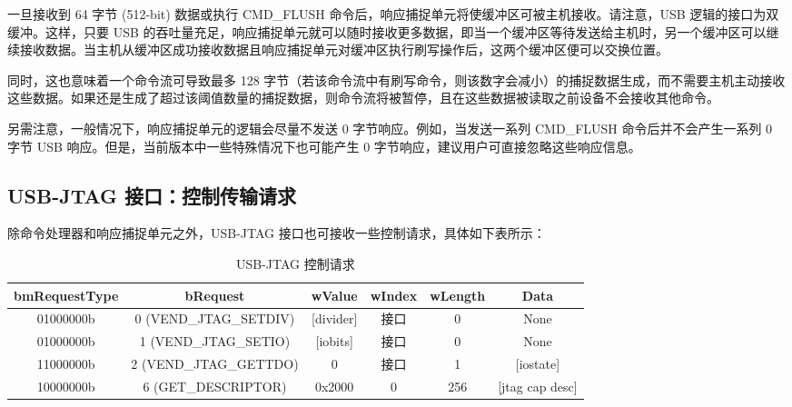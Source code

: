 \documentclass[main\_\_CN.tex]{subfiles}
\begin{document}
一旦接收到 64 字节 (512-bit) 数据或执行 CMD\_FLUSH 命令后，响应捕捉单元将使缓冲区可被主机接收。请注意，USB 逻辑的接口为双缓冲。这样，只要 USB 的吞吐量充足，响应捕捉单元就可以随时接收更多数据，即当一个缓冲区等待发送给主机时，另一个缓冲区可以继续接收数据。当主机从缓冲区成功接收数据且响应捕捉单元对缓冲区执行刷写操作后，这两个缓冲区便可以交换位置。

同时，这也意味着一个命令流可导致最多 128 字节（若该命令流中有刷写命令，则该数字会减小）的捕捉数据生成，而不需要主机主动接收这些数据。如果还是生成了超过该阈值数量的捕捉数据，则命令流将被暂停，且在这些数据被读取之前设备不会接收其他命令。

另需注意，一般情况下，响应捕捉单元的逻辑会尽量不发送 0 字节响应。例如，当发送一系列 CMD\_FLUSH 命令后并不会产生一系列 0 字节 USB 响应。但是，当前版本中一些特殊情况下也可能产生 0 字节响应，建议用户可直接忽略这些响应信息。

\subsection{USB-JTAG 接口：控制传输请求}

除命令处理器和响应捕捉单元之外，USB-JTAG 接口也可接收一些控制请求，具体如下表所示：

\begin{table}[H]
    \centering
    \caption{USB-JTAG 控制请求}
    \label{tab:usbserialjtag-control-requests}
    \begin{tabular}{|c|c|c|c|c|c|}
    \hline
       \rowcolor{lightgray}
       \textbf{bmRequestType} & \textbf{bRequest} & \textbf{wValue} & \textbf{wIndex} & \textbf{wLength} & \textbf{Data} \\\hline
       
       01000000b &  0 (VEND\_JTAG\_SETDIV) & [divider] & 接口 & 0 &  None \\\hline
       01000000b &  1 (VEND\_JTAG\_SETIO) &  [iobits] &  接口 & 0 &   None \\\hline
       11000000b &  2 (VEND\_JTAG\_GETTDO) & 0 & 接口 & 1 & [iostate] \\\hline
       10000000b &  6 (GET\_DESCRIPTOR) &   0x2000 &  0 &  256 & [jtag cap desc] \\\hline
    \end{tabular}
\end{table}
\end{document}
